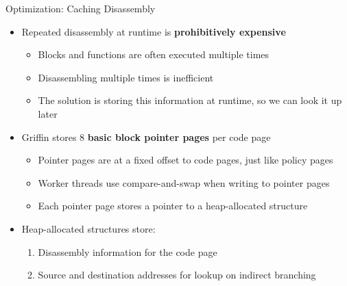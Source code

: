 \documentclass[12pt, dvipsnames, aspectratio=169]{beamer}
\begin{document}
\begin{frame}[c]{Optimization: Caching Disassembly}{}
  \begin{itemize}
    \item Repeated disassembly at runtime is {\bf prohibitively expensive}
    \begin{itemize}
      \item Blocks and functions are often executed multiple times
      \item Disassembling multiple times is inefficient
      \item The solution is storing this information at runtime, so we can look it up later
    \end{itemize}

    \vfill
    \item Griffin stores 8 {\bf basic block pointer pages} per code page
    \begin{itemize}
      \item Pointer pages are at a fixed offset to code pages, just like policy pages
      \item Worker threads use compare-and-swap when writing to pointer pages
      \item Each pointer page stores a pointer to a heap-allocated structure
    \end{itemize}

    \vfill
    \item Heap-allocated structures store:
    \begin{enumerate}
      \item Disassembly information for the code page
      \item Source and destination addresses for lookup on indirect branching
    \end{enumerate}
  \end{itemize}
\end{frame}
\end{document}
